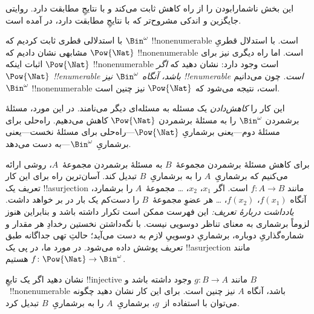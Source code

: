 \documentclass[../../../include/open-logic-section]{subfiles}
\begin{document}


\begin{editorial}
  این بخش ناشمارابودن را از راه کاهش ثابت می‌کند و با نتایجِ
   مطابقت دارد. روایتی جایگزین و اندکی مشروح‌تر که
  با نتایجِ  مطابقت دارد، در  آمده است.
\end{editorial}

با استدلالی قطری ثابت کردیم که $\Bin^\omega$ !!{nonenumerable} است.
با استدلال قطریِ مشابهی نشان دادیم که $\Pow{\Nat}$ !!{nonenumerable}
است. اما راه دیگری نیز برای اثبات اینکه $\Pow{\Nat}$
!!{nonenumerable} است وجود دارد: نشان دهید که \emph{اگر
$\Pow{\Nat}$ !!{enumerable} باشد، آنگاه $\Bin^\omega$ نیز
!!{enumerable} است}. چون می‌دانیم $\Bin^\omega$ !!{nonenumerable} است،
نتیجه می‌شود که $\Pow{\Nat}$ نیز چنین است.

این کار را \emph{کاهش‌دادن} یک مسئله به مسئله‌ای دیگر می‌نامند. در این
مورد، مسئلهٔ برشمردن $\Bin^\omega$ را به مسئلهٔ برشمردن
$\Pow{\Nat}$ کاهش می‌دهیم. راه‌حلی برای مسئلهٔ دوم---یعنی برشماریِ
$\Pow{\Nat}$---راه‌حلی برای مسئلهٔ نخست---یعنی برشماریِ
$\Bin^\omega$---به دست می‌دهد.

برای کاهش مسئلهٔ برشمردن مجموعهٔ~$B$ به مسئلهٔ برشمردن مجموعهٔ~$A$،
روشی ارائه می‌کنیم که برشماریِ~$A$ را به برشماریِ~$B$ تبدیل کند.
آسان‌ترین راه برای این کار تعریف یک !!a{surjection} مانند
$f\colon A \to B$ است. اگر $x_1$، $x_2$، \dots{} مجموعهٔ~$A$ را
برشمارد، آنگاه $f(x_1)$، $f(x_2)$، \dots{} هر عضوِ مجموعهٔ~$B$ را
دست‌کم یک بار در بر خواهد داشت.
\emph{یادداشت دربارهٔ تعریف:} این فهرست ممکن است تکرار داشته باشد و
بنابراین هنوز لزوماً برشماری به معنای تناظر دوسویی نیست. با نگه‌داشتن
نخستین رخدادِ هر مقدار و شماره‌گذاریِ دوباره، برشماریِ دوسوییِ لازم به
دست می‌آید؛ حالتِ تهی جداگانه طبق تعریف پوشش داده می‌شود.
در مورد ما، در پی یک !!a{surjection} مانند $f\colon \Pow{\Nat}
\to \Bin^\omega$ هستیم.

\begin{prob}
نشان دهید اگر یک تابعِ !!{injective} مانند $g\colon B \to A$ وجود داشته
باشد و $B$~!!{nonenumerable} باشد، آنگاه $A$ نیز چنین است. برای این کار
نشان دهید چگونه می‌توان با استفاده از~$g$، برشماریِ~$A$ را به برشماریِ~$B$
تبدیل کرد.
\end{prob}
\end{document}
